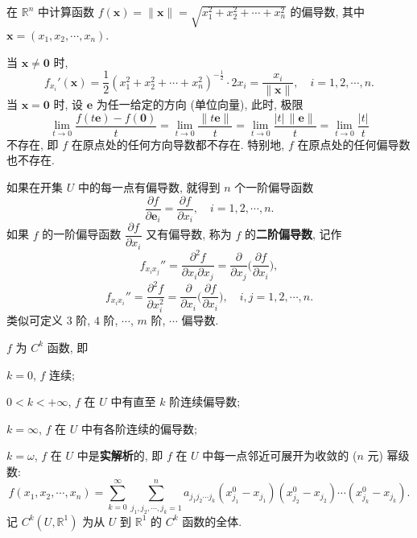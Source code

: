 \begin{example}\label{ex:8.1.3}
在 $\mathbb{R}^{n}$ 中计算函数 $f(\boldsymbol{x}) = \|\boldsymbol{x}\| = \sqrt{x_{1}^{2} + x_{2}^{2} + \cdots + x_{n}^{2}}$ 的偏导数, 其中 $\boldsymbol{x} = (x_{1}, x_{2}, \cdots, x_{n})$.

\begin{solution}
当 $\boldsymbol{x} \neq \boldsymbol{0}$ 时,
\[
  f_{x_{i}}'(\boldsymbol{x}) = \frac{1}{2}(x_{1}^{2} + x_{2}^{2} + \cdots + x_{n}^{2})^{-\frac{1}{2}} \cdot 2x_{i} = \frac{x_{i}}{\|\boldsymbol{x}\|}, \quad i = 1, 2, \cdots, n.
\]
当 $\boldsymbol{x} = \boldsymbol{0}$ 时, 设 $\boldsymbol{e}$ 为任一给定的方向 (单位向量), 此时, 极限
\[
  \lim_{t \to 0}\frac{f(t\boldsymbol{e}) - f(\boldsymbol{0})}{t} = \lim_{t \to 0}\frac{\|t\boldsymbol{e}\|}{t} = \lim_{t \to 0}\frac{|t|\,\|\boldsymbol{e}\|}{t} = \lim_{t \to 0}\frac{|t|}{t}
\]
不存在, 即 $f$ 在原点处的任何方向导数都不存在. 特别地, $f$ 在原点处的任何偏导数也不存在.\qedhere
\end{solution}
\end{example}

如果在开集 $U$ 中的每一点有偏导数, 就得到 $n$ 个一阶偏导函数
\[
  \frac{\partial f}{\partial \boldsymbol{e}_{i}} = \frac{\partial f}{\partial x_{i}}, \quad i = 1, 2, \cdots, n.
\]
如果 $f$ 的一阶偏导函数 $\dfrac{\partial f}{\partial x_{i}}$ 又有偏导数, 称为 $f$ 的\textbf{二阶偏导数}, 记作
\[
  f_{x_{i}x_{j}}'' = \frac{\partial^{2}f}{\partial x_{i}\partial x_{j}} = \frac{\partial}{\partial x_{j}}\Big(\frac{\partial f}{\partial x_{i}}\Big),
\]
\[
  f_{x_{i}x_{i}}'' = \frac{\partial^{2}f}{\partial x_{i}^{2}} = \frac{\partial}{\partial x_{i}}\Big(\frac{\partial f}{\partial x_{i}}\Big), \quad i, j = 1, 2, \cdots, n.
\]
类似可定义 $3$ 阶, $4$ 阶, $\cdots$, $m$ 阶, $\cdots$ 偏导数.

$f$ 为 $C^{k}$ 函数, 即

\noindent $k = 0$, $f$ 连续;

\noindent $0 < k < +\infty$, $f$ 在 $U$ 中有直至 $k$ 阶连续偏导数;

\noindent $k = \infty$, $f$ 在 $U$ 中有各阶连续的偏导数;

\noindent $k = \omega$, $f$ 在 $U$ 中是\textbf{实解析}的, 即 $f$ 在 $U$ 中每一点邻近可展开为收敛的 ($n$ 元) 幂级数:
\[
  f(x_{1}, x_{2}, \cdots, x_{n}) = \sum_{k = 0}^{\infty}\sum_{j_{1}, j_{2}, \cdots, j_{k} = 1}^{n} a_{j_{1}j_{2}\cdots j_{k}}(x_{j_{1}}^{0} - x_{j_{1}})(x_{j_{2}}^{0} - x_{j_{2}})\cdots(x_{j_{k}}^{0} - x_{j_{k}}).
\]
记 $C^{k}(U, \mathbb{R}^{1})$ 为从 $U$ 到 $\mathbb{R}^{1}$ 的 $C^{k}$ 函数的全体.


